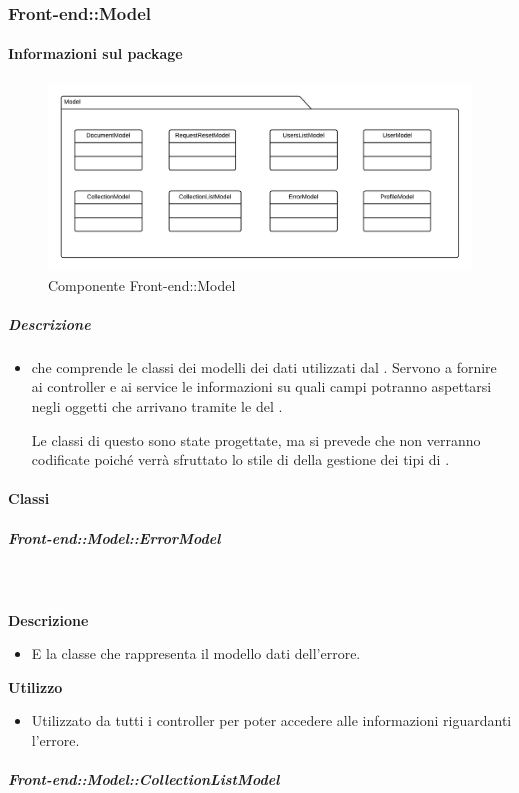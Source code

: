 \begin{itemize}
  \subsubsection{Front-end::Model}
  \paragraph{Informazioni sul package}
    \begin{figure}[H] 
      \begin{center} 
        \includegraphics[width=\textwidth]{packages/Front-end::Model.png}  
        \caption{Componente Front-end::Model}
      \end{center}  
    \end{figure} 
  \subparagraph{Descrizione} 
    \begin{itemize}
    \item[]  che comprende le classi dei modelli dei dati utilizzati dal . Servono a fornire ai controller e ai service le informazioni su quali campi potranno aspettarsi negli oggetti che arrivano tramite le  del .

Le classi di questo  sono state progettate, ma si prevede che non verranno codificate poiché verrà sfruttato lo stile di  della gestione dei tipi di .
    \end{itemize} 
    \paragraph{Classi}
      \subparagraph{Front-end::Model::ErrorModel}
        
        \textbf{\\ \\ Descrizione} 
          \begin{itemize}
            \item[] E la classe che rappresenta il modello dati dell'errore.
          \end{itemize}      
        \textbf{Utilizzo}  
          \begin{itemize}
            \item[] Utilizzato da tutti i controller per poter accedere alle informazioni riguardanti l'errore.
          \end{itemize}
      \subparagraph{Front-end::Model::CollectionListModel}
        

\end{itemize}
